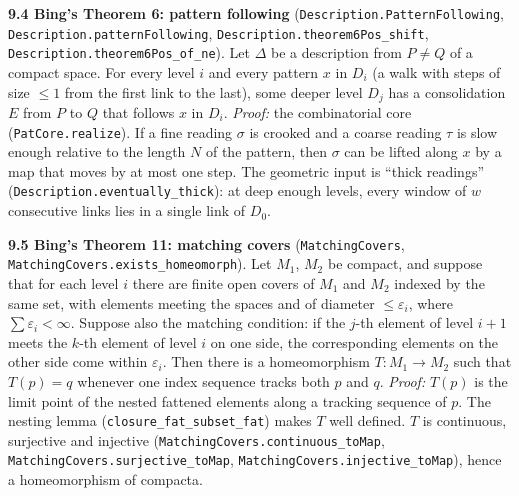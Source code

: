 \documentclass[11pt]{article}
\newcommand{\lean}[1]{\texttt{#1}}
\begin{document}
\textbf{9.4 Bing's Theorem 6: pattern following} (\lean{Description.\hspace{0pt}PatternFollowing}, \lean{Description.\hspace{0pt}patternFollowing}, \lean{Description.\hspace{0pt}theorem6Pos\_\hspace{0pt}shift}, \lean{Description.\hspace{0pt}theorem6Pos\_\hspace{0pt}of\_\hspace{0pt}ne}). Let $\Delta$ be a description from $P \neq Q$ of a compact space. For every level $i$ and every pattern $x$ in $D_i$ (a walk with steps of size $\leq 1$ from the first link to the last), some deeper level $D_j$ has a consolidation $E$ from $P$ to $Q$ that follows $x$ in $D_i$. \emph{Proof:} the combinatorial core (\lean{PatCore.\hspace{0pt}realize}). If a fine reading $\sigma$ is crooked and a coarse reading $\tau$ is slow enough relative to the length $N$ of the pattern, then $\sigma$ can be lifted along $x$ by a map that moves by at most one step. The geometric input is ``thick readings'' (\lean{Description.\hspace{0pt}eventually\_\hspace{0pt}thick}): at deep enough levels, every window of $w$ consecutive links lies in a single link of $D_0$.

\textbf{9.5 Bing's Theorem 11: matching covers} (\lean{MatchingCovers}, \lean{MatchingCovers.\hspace{0pt}exists\_\hspace{0pt}homeomorph}). Let $M_1$, $M_2$ be compact, and suppose that for each level $i$ there are finite open covers of $M_1$ and $M_2$ indexed by the same set, with elements meeting the spaces and of diameter $\leq \varepsilon_i$, where $\sum \varepsilon_i < \infty$. Suppose also the matching condition: if the $j$-th element of level $i + 1$ meets the $k$-th element of level $i$ on one side, the corresponding elements on the other side come within $\varepsilon_i$. Then there is a homeomorphism $T : M_1 \to M_2$ such that $T(p) = q$ whenever one index sequence tracks both $p$ and $q$. \emph{Proof:} $T(p)$ is the limit point of the nested fattened elements along a tracking sequence of $p$. The nesting lemma (\lean{closure\_\hspace{0pt}fat\_\hspace{0pt}subset\_\hspace{0pt}fat}) makes $T$ well defined. $T$ is continuous, surjective and injective (\lean{MatchingCovers.\hspace{0pt}continuous\_\hspace{0pt}toMap}, \lean{MatchingCovers.\hspace{0pt}surjective\_\hspace{0pt}toMap}, \lean{MatchingCovers.\hspace{0pt}injective\_\hspace{0pt}toMap}), hence a homeomorphism of compacta.
\end{document}
